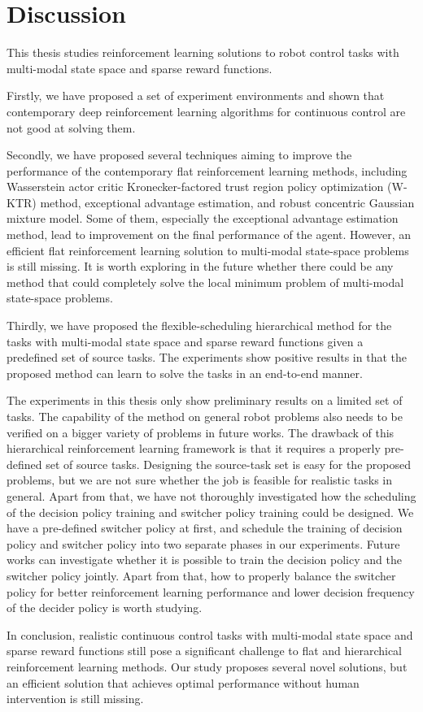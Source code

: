\chapter{Discussion}
This thesis studies reinforcement learning solutions to robot control tasks with multi-modal state space and sparse reward functions.

Firstly, we have proposed a set of experiment environments and shown that contemporary deep reinforcement learning algorithms for continuous control are not good at solving them. 

Secondly, we have proposed several techniques aiming to improve the performance of the contemporary flat reinforcement learning methods, including Wasserstein actor critic Kronecker-factored trust region policy optimization (W-KTR) method, exceptional advantage estimation, and robust concentric Gaussian mixture model. Some of them, especially the exceptional advantage estimation method, lead to improvement on the final performance of the agent. However, an efficient flat reinforcement learning solution to multi-modal state-space problems is still missing. It is worth exploring in the future whether there could be any method that could completely solve the local minimum problem of multi-modal state-space problems.

Thirdly, we have proposed the flexible-scheduling hierarchical method for the tasks with multi-modal state space and sparse reward functions given a predefined set of source tasks. The experiments show positive results in that the proposed method can learn to solve the tasks in an end-to-end manner.

The experiments in this thesis only show preliminary results on a limited set of tasks. The capability of the method on general robot problems also needs to be verified on a bigger variety of problems in future works. The drawback of this hierarchical reinforcement learning framework is that it requires a properly pre-defined set of source tasks. Designing the source-task set is easy for the proposed problems, but we are not sure whether the job is feasible for realistic tasks in general. Apart from that, we have not thoroughly investigated how the scheduling of the decision policy training and switcher policy training could be designed. We have a pre-defined switcher policy at first, and schedule the training of decision policy and switcher policy into two separate phases in our experiments. Future works can investigate whether it is possible to train the decision policy and the switcher policy jointly. Apart from that, how to properly balance the switcher policy for better reinforcement learning performance and lower decision frequency of the decider policy is worth studying.

In conclusion, realistic continuous control tasks with multi-modal state space and sparse reward functions still pose a significant challenge to flat and hierarchical reinforcement learning methods. Our study proposes several novel solutions, but an efficient solution that achieves optimal performance without human intervention is still missing.